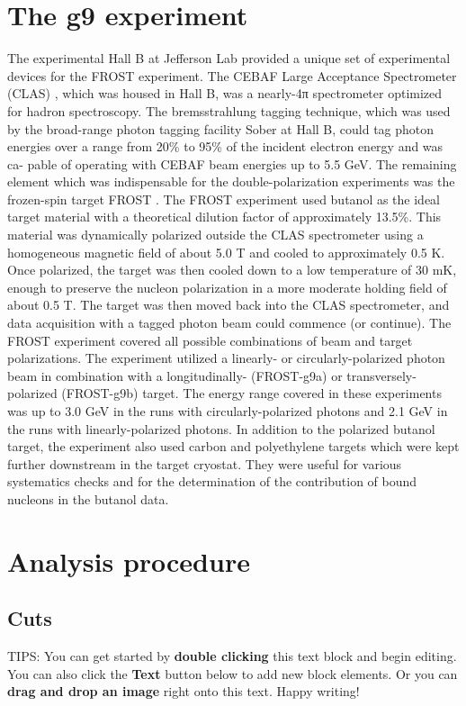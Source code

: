 
\tableofcontents

\section{The g9 experiment}
The experimental Hall B at Jefferson Lab provided a unique set of experimental devices for the
FROST experiment. The CEBAF Large Acceptance Spectrometer (CLAS)\cite{CLAS} , which was housed
in Hall B, was a nearly-4π spectrometer optimized for hadron spectroscopy. The bremsstrahlung
tagging technique, which was used by the broad-range photon tagging facility Sober\cite{Sober_2000} at Hall B, could
tag photon energies over a range from 20\% to 95\% of the incident electron energy and was ca-
pable of operating with CEBAF beam energies up to 5.5 GeV. The remaining element which was
indispensable for the double-polarization experiments was the frozen-spin target FROST \cite{Keith_2012}. The
FROST experiment used butanol as the ideal target material with a theoretical dilution factor of
approximately 13.5\%. This material was dynamically polarized outside the CLAS spectrometer using a homogeneous magnetic field of about 5.0 T and cooled to approximately 0.5 K. Once polarized,
the target was then cooled down to a low temperature of 30 mK, enough to preserve the nucleon
polarization in a more moderate holding field of about 0.5 T. The target was then moved back
into the CLAS spectrometer, and data acquisition with a tagged photon beam could commence (or
continue). The FROST experiment covered all possible combinations of beam and target polarizations. The experiment utilized a linearly- or circularly-polarized photon beam in combination with
a longitudinally- (FROST-g9a) or transversely-polarized (FROST-g9b) target. The energy range
covered in these experiments was up to 3.0 GeV in the runs with circularly-polarized photons and
2.1 GeV in the runs with linearly-polarized photons. In addition to the polarized butanol target,
the experiment also used carbon and polyethylene targets which were kept further downstream in
the target cryostat. They were useful for various systematics checks and for the determination of
the contribution of bound nucleons in the butanol data.

\section{Analysis procedure}
\subsection{Cuts}



TIPS:
You can get started by \textbf{double clicking} this text block and begin editing. You can also click the \textbf{Text} button below to add new block elements. Or you can \textbf{drag and drop an image} right onto this text. Happy writing!
